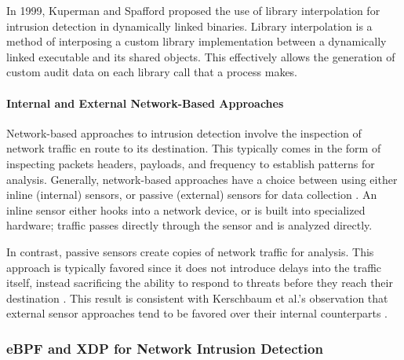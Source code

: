 \documentclass[
  12pt]{findlay}
\begin{document}
In 1999, Kuperman and Spafford \autocite{kuperman99} proposed the use of
library interpolation for intrusion detection in dynamically linked
binaries. Library interpolation is a method of interposing a custom
library implementation between a dynamically linked executable and its
shared objects. This effectively allows the generation of custom audit
data on each library call that a process makes.

\hypertarget{internal-and-external-network-based-approaches}{%
\paragraph{Internal and External Network-Based
Approaches}\label{internal-and-external-network-based-approaches}}

Network-based approaches \autocite{stallings07} to intrusion detection
involve the inspection of network traffic en route to its destination.
This typically comes in the form of inspecting packets headers,
payloads, and frequency to establish patterns for analysis. Generally,
network-based approaches have a choice between using either inline
(internal) sensors, or passive (external) sensors for data collection
\autocite{stallings07}. An inline sensor either hooks into a network
device, or is built into specialized hardware; traffic passes directly
through the sensor and is analyzed directly.

In contrast, passive sensors create copies of network traffic for
analysis. This approach is typically favored since it does not introduce
delays into the traffic itself, instead sacrificing the ability to
respond to threats before they reach their destination
\autocite{stallings07}. This result is consistent with Kerschbaum et
al.'s observation that external sensor approaches tend to be favored
over their internal counterparts \autocite{spafford02}.

\hypertarget{ebpf-and-xdp-for-network-intrusion-detection}{%
\subsubsection{eBPF and XDP for Network Intrusion
Detection}\label{ebpf-and-xdp-for-network-intrusion-detection}}
\end{document}
